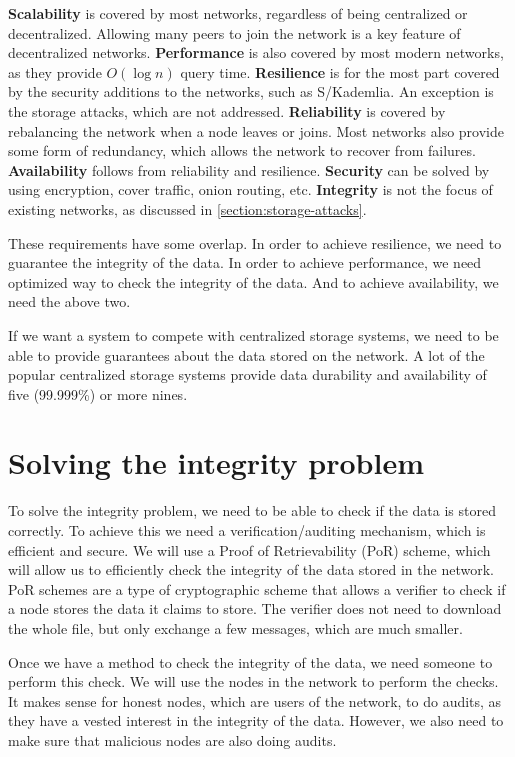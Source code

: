 \textbf{Scalability} is covered by most networks, regardless of being centralized or decentralized.
Allowing many peers to join the network is a key feature of decentralized networks.
\textbf{Performance} is also covered by most modern networks, as they provide $O(\log n)$ query time.
\textbf{Resilience} is for the most part covered by the security additions to the networks, such as S/Kademlia.
An exception is the storage attacks, which are not addressed.
\textbf{Reliability} is covered by rebalancing the network when a node leaves or joins.
Most networks also provide some form of redundancy, which allows the network to recover from failures.
\textbf{Availability} follows from reliability and resilience.
\textbf{Security} can be solved by using encryption, cover traffic, onion routing, etc.
\textbf{Integrity} is not the focus of existing networks, as discussed in \ref{section:storage-attacks}.

These requirements have some overlap.
In order to achieve resilience, we need to guarantee the integrity of the data.
In order to achieve performance, we need optimized way to check the integrity of the data.
And to achieve availability, we need the above two.

If we want a system to compete with centralized storage systems, we
need to be able to provide guarantees about the data stored on the network.
A lot of the popular centralized storage systems provide data durability and
availability of five (99.999\%) or more nines.

\section{Solving the integrity problem}

To solve the integrity problem, we need to be able to check if the data is stored correctly.
To achieve this we need a verification/auditing mechanism, which is efficient and secure.
We will use a Proof of Retrievability (PoR) scheme, which will allow us to efficiently check the 
integrity of the data stored in the network.
PoR schemes are a type of cryptographic scheme that allows a verifier to check if a node
stores the data it claims to store.
The verifier does not need to download the whole file, but only exchange a few messages, which are much smaller.

Once we have a method to check the integrity of the data, we need someone to perform this check.
We will use the nodes in the network to perform the checks.
It makes sense for honest nodes, which are users of the network, to do audits,
as they have a vested interest in the integrity of the data.
However, we also need to make sure that malicious nodes are also doing audits.

